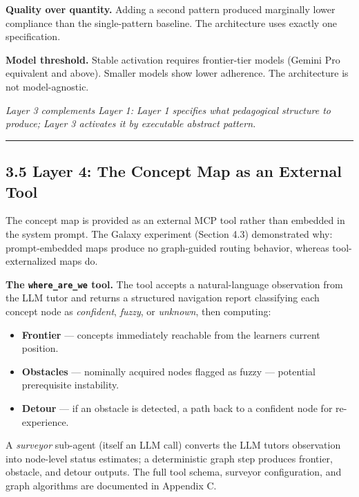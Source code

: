 \documentclass[
]{article}
\providecommand{\tightlist}{%
  \setlength{\itemsep}{0pt}\setlength{\parskip}{0pt}}
\begin{document}
\textbf{Quality over quantity.} Adding a second pattern produced marginally lower compliance than the single-pattern baseline. The architecture uses exactly one specification.

\textbf{Model threshold.} Stable activation requires frontier-tier models (Gemini Pro equivalent and above). Smaller models show lower adherence. The architecture is not model-agnostic.

\emph{Layer 3 complements Layer 1: Layer 1 specifies what pedagogical structure to produce; Layer 3 activates it by executable abstract pattern.}

\begin{center}\rule{0.5\linewidth}{0.5pt}\end{center}

\subsection{3.5 Layer 4: The Concept Map as an External Tool}\label{35-layer-4-the-concept-map-as-an-external-tool}

The concept map is provided as an external MCP tool rather than embedded in the system prompt. The Galaxy experiment (Section 4.3) demonstrated why: prompt-embedded maps produce no graph-guided routing behavior, whereas tool-externalized maps do.

\textbf{The \texttt{where\_are\_we} tool.} The tool accepts a natural-language observation from the LLM tutor and returns a structured navigation report classifying each concept node as \emph{confident}, \emph{fuzzy}, or \emph{unknown}, then computing:

\begin{itemize}
\tightlist
\item
  \textbf{Frontier} --- concepts immediately reachable from the learner\textquotesingle s current position.
\item
  \textbf{Obstacles} --- nominally acquired nodes flagged as fuzzy --- potential prerequisite instability.
\item
  \textbf{Detour} --- if an obstacle is detected, a path back to a confident node for re-experience.
\end{itemize}

A \emph{surveyor} sub-agent (itself an LLM call) converts the LLM tutor\textquotesingle s observation into node-level status estimates; a deterministic graph step produces frontier, obstacle, and detour outputs. The full tool schema, surveyor configuration, and graph algorithms are documented in Appendix C.
\end{document}
